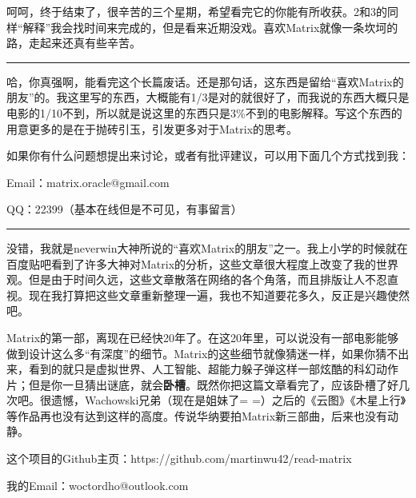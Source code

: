 \documentclass{ctexart}
\newcommand{\myparsep}{\noindent \rule[0.5ex]{\linewidth}{1pt}}
\begin{document}
呵呵，终于结束了，很辛苦的三个星期，希望看完它的你能有所收获。2和3的同样“解释”我会找时间来完成的，但是看来近期没戏。喜欢Matrix就像一条坎坷的路，走起来还真有些辛苦。

\myparsep

哈，你真强啊，能看完这个长篇废话。还是那句话，这东西是留给“喜欢Matrix的朋友”的。我这里写的东西，大概能有1/3是对的就很好了，而我说的东西大概只是电影的1/10不到，所以就是说这里的东西只是3\%不到的电影解释。写这个东西的用意更多的是在于抛砖引玉，引发更多对于Matrix的思考。

如果你有什么问题想提出来讨论，或者有批评建议，可以用下面几个方式找到我：

Email：matrix.oracle@gmail.com

QQ：22399（基本在线但是不可见，有事留言）


\myparsep

没错，我就是neverwin大神所说的“喜欢Matrix的朋友”之一。我上小学的时候就在百度贴吧看到了许多大神对Matrix的分析，这些文章很大程度上改变了我的世界观。但是由于时间久远，这些文章散落在网络的各个角落，而且排版让人不忍直视。现在我打算把这些文章重新整理一遍，我也不知道要花多久，反正是兴趣使然吧。

Matrix的第一部，离现在已经快20年了。在这20年里，可以说没有一部电影能够做到设计这么多“有深度”的细节。Matrix的这些细节就像猜迷一样，如果你猜不出来，看到的就只是虚拟世界、人工智能、超能力躲子弹这样一部炫酷的科幻动作片；但是你一旦猜出谜底，就会{\bf 卧槽}。既然你把这篇文章看完了，应该卧槽了好几次吧。很遗憾，Wachowski兄弟（现在是姐妹了= =）之后的《云图》《木星上行》等作品再也没有达到这样的高度。传说华纳要拍Matrix新三部曲，后来也没有动静。

这个项目的Github主页：https://github.com/martinwu42/read-matrix

我的Email：woctordho@outlook.com

\end{document}
